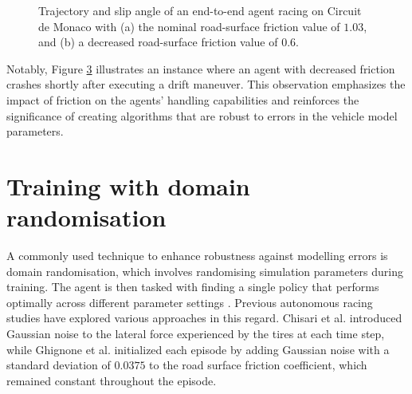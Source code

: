 \begin{figure}[htb!]
    \centering
    \begin{subfigure}[htb!]{0.45\textwidth}
        \centering
        
        \caption{}
        \label{fig:no_error}
    \end{subfigure}
    \hfill
    \begin{subfigure}[htb!]{0.45\textwidth}
        \centering
        
        \caption{}
        \label{fig:error}
    \end{subfigure}
    \caption[Trajectory and slip angle of an end-to-end agent racing on Circuit de Monaco]{Trajectory and slip angle of an end-to-end agent racing on Circuit de Monaco with (a) the nominal road-surface friction value of $1.03$, and (b) a decreased road-surface friction value of $0.6$.}
    \label{fig:mco_slip}
\end{figure}

Notably, Figure \ref{fig:mco_slip} illustrates an instance where an agent with decreased friction crashes shortly after executing a drift maneuver. 
This observation emphasizes the impact of friction on the agents' handling capabilities and reinforces the significance of creating algorithms that are robust to errors in the vehicle model parameters.




\section{Training with domain randomisation}

A commonly used technique to enhance robustness against modelling errors is domain randomisation, which involves randomising simulation parameters during training. 
The agent is then tasked with finding a single policy that performs optimally across different parameter settings \cite{Zhou2020}. 
Previous autonomous racing studies have explored various approaches in this regard. 
Chisari et al. \cite{Chisari2021} introduced Gaussian noise to the lateral force experienced by the tires at each time step, while Ghignone et al. \cite{Ghignone2022} initialized each episode by adding Gaussian noise with a standard deviation of $0.0375$ to the road surface friction coefficient, which remained constant throughout the episode.

